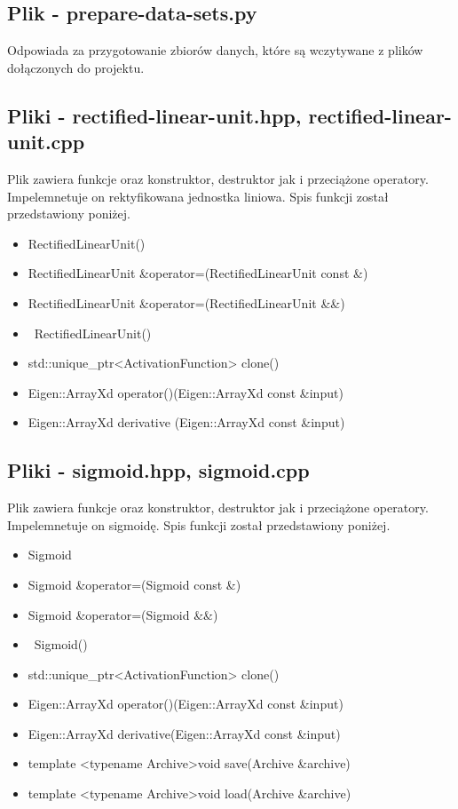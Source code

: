 \documentclass{classrep}
\begin{document}
{        \subsection{Plik - prepare-data-sets.py}
        {
            Odpowiada za przygotowanie zbiorów danych, które są wczytywane z plików
            dołączonych do projektu.
        }

        \subsection{Pliki - rectified-linear-unit.hpp, rectified-linear-unit.cpp}
        {
            Plik zawiera funkcje oraz konstruktor, destruktor jak i przeciążone operatory.
            Impelemnetuje on rektyfikowana jednostka liniowa.
            Spis funkcji został przedstawiony poniżej.
            \begin{itemize}
                \item RectifiedLinearUnit()
                \item RectifiedLinearUnit \&operator=(RectifiedLinearUnit const \&)
                \item RectifiedLinearUnit \&operator=(RectifiedLinearUnit \&\&)
                \item ~RectifiedLinearUnit()
                \item std::unique\_ptr<ActivationFunction> clone()
                \item Eigen::ArrayXd operator()(Eigen::ArrayXd const \&input)
                \item Eigen::ArrayXd derivative (Eigen::ArrayXd const \&input)
            \end{itemize}
        }

        \subsection{Pliki - sigmoid.hpp, sigmoid.cpp}
        {
            Plik zawiera funkcje oraz konstruktor, destruktor jak i przeciążone operatory.
            Impelemnetuje on sigmoidę.
            Spis funkcji został przedstawiony poniżej.
            \begin{itemize}
                \item Sigmoid
                \item Sigmoid \&operator=(Sigmoid const \&)
                \item Sigmoid \&operator=(Sigmoid \&\&)
                \item ~Sigmoid()
                \item std::unique\_ptr<ActivationFunction> clone()
                \item Eigen::ArrayXd operator()(Eigen::ArrayXd const \&input)
                \item Eigen::ArrayXd derivative(Eigen::ArrayXd const \&input)
                \item  template <typename Archive>void save(Archive \&archive)
                \item template <typename Archive>void load(Archive \&archive)
            \end{itemize}
        }

}
\end{document}
